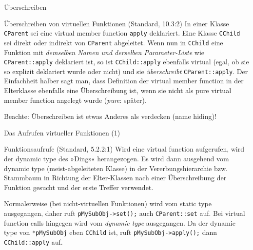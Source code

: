 \begin{frame}[fragile]{Überschreiben}
	\begin{block}{Überschreiben von virtuellen Funktionen (Standard, 10.3:2)}
		In einer Klasse \verb|CParent| sei eine virtual member function \verb|apply| deklariert. Eine Klasse \verb|CChild| sei direkt oder indirekt von \verb|CParent| abgeleitet. Wenn nun in \verb|CChild| eine Funktion mit \emph{demselben Namen und derselben Parameter-Liste} wie \verb|CParent::apply| deklariert ist, so ist \verb|CChild::apply| ebenfalls virtual (egal, ob sie so explizit deklariert wurde oder nicht) und sie \emph{überschreibt} \verb|CParent::apply|.
		Der Einfachheit halber sagt man, dass Definition der virtual member function in der Elterklasse ebenfalls eine Überschreibung ist, wenn sie nicht als pure virtual member function angelegt wurde (\emph{pure}: später).
	\end{block}
	
	\vspace{1em}
	
	Beachte: Überschreiben ist etwas Anderes als verdecken (name hiding)!
\end{frame}

\begin{frame}[fragile]{Das Aufrufen virtueller Funktionen (1)}
	\begin{block}{Funktionsaufrufe (Standard, 5.2.2:1)}
		Wird eine virtual function aufgerufen, wird der dynamic type des »Dings« herangezogen. Es wird dann ausgehend vom dynamic type (meist-abgeleiteten Klasse) in der Vererbungshierarchie bzw. Stammbaum in Richtung der Elter-Klassen nach einer Überschreibung der Funktion gesucht und der erste Treffer verwendet.
	\end{block}
	
	\pause
	\vspace{1em}
	
	Normalerweise (bei nicht-virtuellen Funktionen) wird vom static type ausgegangen, daher ruft \verb|pMySubObj->set();| auch \verb|CParent::set| auf.
	\vspace{0.5em}
	Bei virtual function calls hingegen wird vom \emph{dynamic type} ausgegangen. Da der dynamic type von \verb|*pMySubObj| eben \verb|CChild| ist, ruft \verb|pMySubObj->apply();| dann \verb|CChild::apply| auf.
\end{frame}

